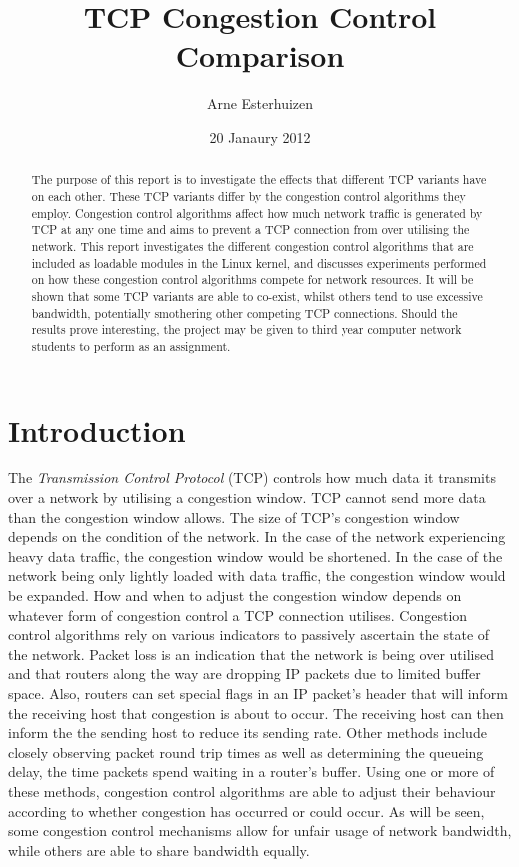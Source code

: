 \documentclass[11pt,a4paper,twocolumn]{article}
\begin{document}
\title{
	TCP Congestion Control Comparison
}
\author{
	Arne Esterhuizen
}
\date{20 Janaury 2012}
\maketitle

\begin{abstract}
The purpose of this report is to investigate the effects that different TCP variants have on each other.
These TCP variants differ by the congestion control algorithms they employ. Congestion control algorithms affect
how much network traffic is generated by TCP at any one time and aims to prevent a TCP connection from over utilising
the network. This report investigates the different congestion control algorithms that are included as loadable
modules in the Linux kernel, and discusses experiments performed on how these congestion control algorithms compete
for network resources. It will be shown that some TCP variants are able to 
co-exist, whilst others tend to 
use excessive bandwidth, potentially smothering other competing TCP connections.
Should the results prove interesting, the project may be given to third year computer network students to 
perform as an assignment.
\end{abstract}

\tableofcontents

\section{Introduction}
\label{sec:intro}

The \textit{Transmission Control Protocol} (TCP) controls how much data it transmits over a network by utilising
a congestion window. TCP cannot send more data than the congestion window allows. The size of TCP's congestion
window depends on the condition of the network. In the case of the network experiencing heavy data traffic, the congestion window
would be shortened. In the case of the network being only lightly loaded with data traffic, the congestion window would
be expanded. How and when to adjust the congestion window depends on whatever form of congestion control
a TCP connection utilises. Congestion control algorithms rely on various indicators to passively ascertain the state of the network.
Packet loss is an indication that the network is being over utilised and that routers along the way are dropping IP packets
due to limited buffer space. Also, routers can set special flags in an IP packet's header that will inform the receiving host
that congestion is about to occur. The receiving host can then inform the the sending host to reduce its sending rate.
Other methods include closely observing packet round trip times as well as determining the queueing delay, the time packets
spend waiting in a router's buffer.
Using one or more of these methods, congestion control algorithms are able to adjust their behaviour according to whether congestion
has occurred or could occur. As will be seen, some congestion control mechanisms allow for unfair usage of network bandwidth,
while others are able to share bandwidth equally.
\end{document}

